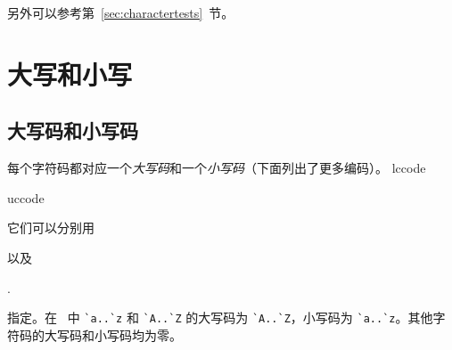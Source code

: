 \documentclass{book}
\begin{document}
另外可以参考第~\ref{sec:charactertests}~节。


\section{大写和小写}

\subsection{大写码和小写码}
\label{uc/lc}

每个字符码都对应一个\emph{大写码}和一个\emph{小写码}（下面列出了更多编码）。%
\cstoidx lccode\par\cstoidx uccode\par
{}%
%
它们可以分别用
\begin{Disp}\end{Disp}
以及
\begin{Disp}.\end{Disp}
指定。在 \IniTeX\ 中 \verb-`a..`z- 和 \verb-`A..`Z- 的大写码为
\label{ini:uclc}
\verb-`A..`Z-，小写码为 \verb-`a..`z-。其他字符码的大写码和小写码均为零。
\end{document}
